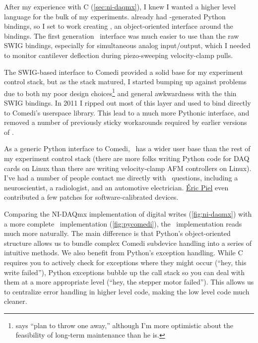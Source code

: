 After my experience with C (\cref{sec:ni-daqmx}), I knew I wanted a
higher level language for the bulk of my experiments.
 already had -generated
Python bindings, so I set to work creating \pycomedi, an
object-oriented interface around the  bindings.
The first generation \pycomedi\ interface was much easier to use than
the raw SWIG bindings, especially for simultaneous analog
input/output, which I needed to monitor cantilever deflection during
piezo-sweeping velocity-clamp pulls.

The SWIG-based interface to Comedi provided a solid base for my
experiment control stack, but as the stack matured, I started bumping
up against problems due to both my poor design
choices\footnote{\citet{brooks95} says ``plan to throw one away,''
  although I'm more optimistic about the feasibility of long-term
  maintenance than he is.} and general awkwardness with the thin SWIG
bindings.  In 2011 I ripped out most of this layer and used
 to bind directly to Comedi's userspace library.
This lead to a much more Pythonic interface, and removed a number of
previously sticky workarounds required by earlier versions of
\pycomedi.

As a generic Python interface to Comedi, \pycomedi\ has a wider user
base than the rest of my experiment control stack (there are more
folks writing Python code for DAQ cards on Linux than there are
writing velocity-clamp AFM controllers on Linux).  I've had a number
of people contact me directly with \pycomedi\ questions, including a
neuroscientist, a radiologist, and an automotive electrician.
\href{http://pieleric.free.fr/}{\'Eric Piel} even contributed a few
patches for software-calibrated devices.

Comparing the NI-DAQmx implementation of digital writes
(\cref{fig:ni-daqmx}) with a more complete \pycomedi\ implementation
(\cref{fig:pycomedi}), the \pycomedi\ implementation reads much more
naturally.  The main difference is that Python's object-oriented
structure allows us to bundle complex Comedi subdevice handling into a
series of intuitive methods.  We also benefit from Python's exception
handling.  While C requires you to actively check for exceptions where
they might occur (``hey, this write failed''), Python exceptions
bubble up the call stack so you can deal with them at a more
appropriate level (``hey, the stepper motor failed'').  This allows us
to centralize error handling in higher level code, making the low
level code much cleaner.

